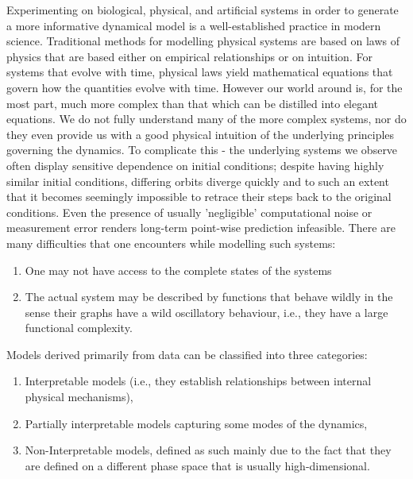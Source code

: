 \documentclass[a4paper,12pt,twoside]{report}
\begin{document}
Experimenting on biological, physical, and artificial systems in order to generate a more informative dynamical model is a well-established practice in modern science. Traditional methods for modelling physical systems are based on laws of physics that are based either on empirical relationships or on intuition. For systems that evolve with time, physical laws yield mathematical equations that govern how the quantities evolve with time. However our world around is, for the most part, much more complex than that which can be distilled into elegant equations. We do not fully understand many of the more complex systems, nor do they even provide us with a good physical intuition of the underlying principles governing the dynamics. 
To complicate this - the underlying systems we observe often display sensitive dependence on initial conditions; despite having highly similar initial conditions, differing orbits diverge quickly and to such an extent that it becomes seemingly impossible to retrace their steps back to the original conditions. Even the presence of usually 'negligible' computational noise or measurement error renders long-term point-wise prediction infeasible. 
There are many difficulties that one encounters while modelling such systems:
\vspace{-8mm}
\begin{enumerate}[noitemsep, label=\roman*.]
  \item One may not have access to the complete states of the systems
  \item The actual system may be described by functions that behave wildly in the sense their graphs have a wild oscillatory behaviour, i.e., they have a large functional complexity.    
\end{enumerate}


Models derived primarily from data can be classified into three categories: 
\vspace{-8mm}
\begin{enumerate}[noitemsep, label=\roman*.]
  \item  Interpretable models (i.e., they establish relationships between internal physical mechanisms), 
  \item Partially interpretable models capturing some modes of the dynamics, 
  \item Non-Interpretable models, defined as such mainly due to the fact that they are defined on a different phase space that is usually high-dimensional. 
\end{enumerate}
\end{document}
